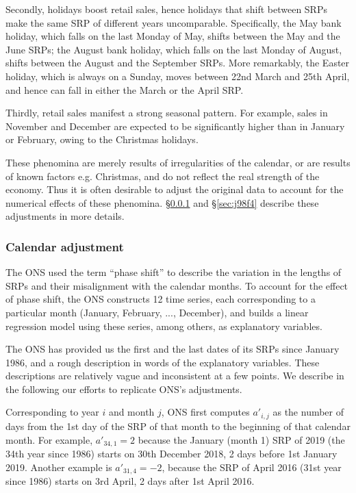 \documentclass[a4paper,11pt,pdftex,twoside,titlepage]{article}
\begin{document}
Secondly, holidays boost retail sales, hence holidays that shift
between SRPs make the same SRP of different years
uncomparable. Specifically, the May bank holiday, which falls on the
last Monday of May, shifts between the May and the June SRPs; the
August bank holiday, which falls on the last Monday of August, shifts
between the August and the September SRPs. More remarkably, the Easter
holiday, which is always on a Sunday, moves between 22nd March and
25th April, and hence can fall in either the March or the April SRP.

Thirdly, retail sales manifest a strong seasonal pattern. For example,
sales in November and December are expected to be significantly higher
than in January or February, owing to the Christmas holidays.

These phenomina are merely results of irregularities of the calendar,
or are results of known factors e.g. Christmas, and do not reflect the
real strength of the economy. Thus it is often desirable to adjust
the original data to account for the numerical effects of these
phenomina. \S\ref{sec:f455} and \S\ref{sec:j98f4} describe these
adjustments in more details.

\subsubsection{Calendar adjustment}\label{sec:f455}
The ONS used the term ``phase shift'' to describe the variation in the
lengths of SRPs and their misalignment with the calendar months. To
account for the effect of phase shift, the ONS constructs 12
time series, each corresponding to a particular month (January,
February, ..., December), and builds a linear regression model using
these series, among others, as explanatory variables.

The ONS has provided us the first and the last dates of its SRPs since
January 1986, and a rough description in words of the explanatory
variables. These descriptions are relatively vague and inconsistent at
a few points. We describe in the following our efforts to replicate
ONS's adjustments.

Corresponding to year $i$ and month $j$, ONS first computes $a'_{i, j}$
as the number of days from the 1st day of the SRP of that month to the
beginning of that calendar month. For example, $a'_{34, 1} = 2$ because
the January (month 1) SRP of 2019 (the 34th year since 1986) starts on
30th December 2018, 2 days before 1st January 2019. Another example is
$a'_{31, 4} = -2$, because the SRP of April 2016 (31st year since 1986)
starts on 3rd April, 2 days after 1st April 2016.
\end{document}
